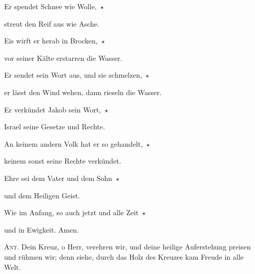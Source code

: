 \noindent Er spendet Schnee wie Wolle,~$\star$~\nopagebreak

streut den Reif aus wie Asche.

\noindent Eis wirft er herab in Brocken,~$\star$~\nopagebreak

vor seiner Kälte erstarren die Wasser.

\noindent Er sendet sein Wort aus, und sie schmelzen,~$\star$~\nopagebreak

er lässt den Wind wehen, dann rieseln die Wasser.

\noindent Er verkündet Jakob sein Wort,~$\star$~\nopagebreak

Israel seine Gesetze und Rechte.

\noindent An keinem andern Volk hat er so gehandelt,~$\star$~\nopagebreak

keinem sonst seine Rechte verkündet.

\noindent Ehre sei dem Vater und dem Sohn~$\star$~\nopagebreak

und dem Heiligen Geist.

\noindent Wie im Anfang, so auch jetzt und alle Zeit~$\star$~\nopagebreak

und in Ewigkeit. Amen.

\vspace{10pt}

\noindent \textsc{Ant.} Dein Kreuz, o Herr, verehren wir, und deine heilige Auferstehung preisen und rühmen wir; denn siehe, durch das Holz des Kreuzes kam Freude in alle Welt.